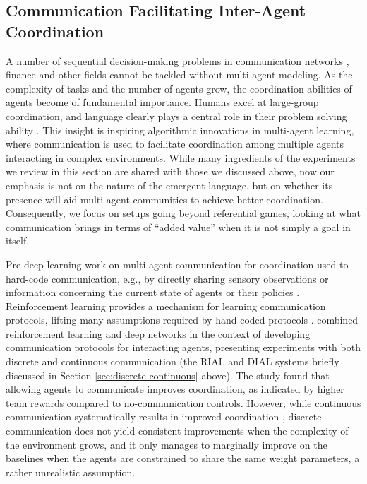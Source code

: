 \subsection{Communication Facilitating Inter-Agent Coordination}
\label{sec:agent-coordination}

A number of sequential decision-making problems in communication networks \cite{Cortes:etal:2004}, finance \cite{Lux:Marchesi:1999} and other fields cannot be tackled without multi-agent modeling. As the complexity of tasks and the number of agents grow, the coordination abilities of agents become of fundamental importance. Humans excel at large-group coordination, and language clearly plays a central role in their problem solving ability \cite{Tomasello:2010,DavidBarrett:Dunbar:2016,Lupyan:Bergen:2016}. This insight is inspiring algorithmic innovations in multi-agent learning, where communication is used to facilitate coordination among multiple agents interacting in complex environments. While many ingredients of the experiments we review in this section are shared with those we discussed above, now our emphasis is not on the nature of the emergent language, but on whether its presence will aid multi-agent communities to achieve better coordination. Consequently, we focus on setups going beyond referential games, looking at what communication brings in terms of ``added value'' when it is not simply a goal in itself.

Pre-deep-learning work on multi-agent communication for coordination
\cite{Panait:Luke:2005} used to hard-code communication, e.g., by directly
sharing sensory observations or information concerning the current
state of agents or their policies
\cite{Tan:1993}. %
Reinforcement learning provides a mechanism for learning communication
protocols, lifting many assumptions required by hand-coded
protocols \cite{Kasai:etal:2008}.   combined reinforcement
learning and deep networks in the context of developing communication
protocols for interacting agents, presenting experiments with both
discrete and continuous communication (the RIAL and DIAL systems briefly discussed in Section \ref{sec:discrete-continuous} above). The study found that allowing agents to communicate improves coordination, as indicated by
higher team rewards compared to no-communication controls. However,
while continuous communication systematically results in improved
coordination \cite<see also>{Sukhbaatar:etal:2016,Kim:etal:2019,Singh:etal:2019},
discrete communication does not yield consistent improvements when the
complexity of the environment grows, and it only manages to marginally improve
on the baselines when the agents are constrained to share the same
weight parameters, a rather unrealistic assumption.

